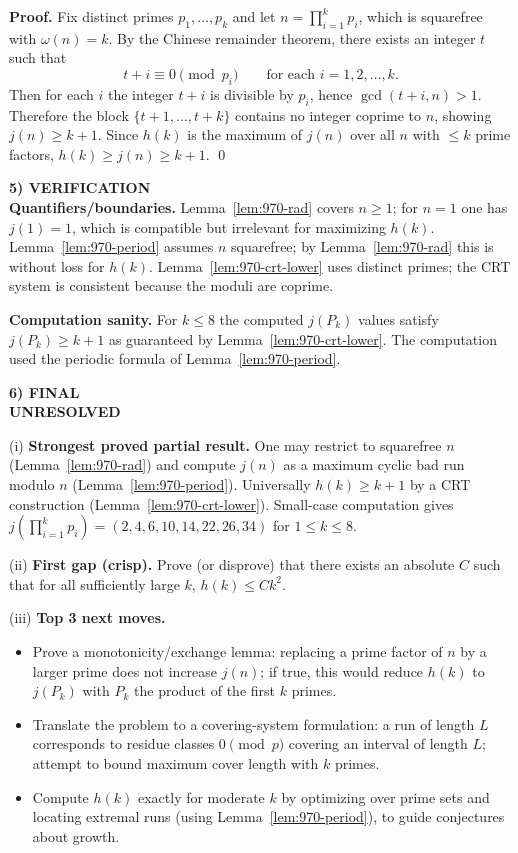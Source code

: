\noindent\textbf{Proof.}
Fix distinct primes $p_1,\dots,p_k$ and let $n=\prod_{i=1}^k p_i$, which is squarefree with $\omega(n)=k$.  By the Chinese remainder theorem, there exists an integer $t$ such that
\[
 t+i\equiv 0\pmod{p_i}\qquad\text{for each }i=1,2,\dots,k.
\]
Then for each $i$ the integer $t+i$ is divisible by $p_i$, hence $\gcd(t+i,n)>1$.
Therefore the block $\{t+1,\dots,t+k\}$ contains no integer coprime to $n$, showing $j(n)\ge k+1$.
Since $h(k)$ is the maximum of $j(n)$ over all $n$ with $\le k$ prime factors, $h(k)\ge j(n)\ge k+1$. \qed

\medskip
\noindent\textbf{5) VERIFICATION}\\
\textbf{Quantifiers/boundaries.} Lemma~\ref{lem:970-rad} covers $n\ge 1$; for $n=1$ one has $j(1)=1$, which is compatible but irrelevant for maximizing $h(k)$.
Lemma~\ref{lem:970-period} assumes $n$ squarefree; by Lemma~\ref{lem:970-rad} this is without loss for $h(k)$.
Lemma~\ref{lem:970-crt-lower} uses distinct primes; the CRT system is consistent because the moduli are coprime.

\textbf{Computation sanity.} For $k\le 8$ the computed $j(P_k)$ values satisfy $j(P_k)\ge k+1$ as guaranteed by Lemma~\ref{lem:970-crt-lower}.  The computation used the periodic formula of Lemma~\ref{lem:970-period}.

\medskip
\noindent\textbf{6) FINAL}\\
\textbf{UNRESOLVED}

(i) \textbf{Strongest proved partial result.} One may restrict to squarefree $n$ (Lemma~\ref{lem:970-rad}) and compute $j(n)$ as a maximum cyclic bad run modulo $n$ (Lemma~\ref{lem:970-period}).  Universally $h(k)\ge k+1$ by a CRT construction (Lemma~\ref{lem:970-crt-lower}).  Small-case computation gives $j(\prod_{i=1}^k p_i)=(2,4,6,10,14,22,26,34)$ for $1\le k\le 8$.

(ii) \textbf{First gap (crisp).} Prove (or disprove) that there exists an absolute $C$ such that for all sufficiently large $k$, $h(k)\le Ck^2$.

(iii) \textbf{Top 3 next moves.}
\begin{itemize}
\item Prove a monotonicity/exchange lemma: replacing a prime factor of $n$ by a larger prime does not increase $j(n)$; if true, this would reduce $h(k)$ to $j(P_k)$ with $P_k$ the product of the first $k$ primes.
\item Translate the problem to a covering-system formulation: a run of length $L$ corresponds to residue classes $0\pmod p$ covering an interval of length $L$; attempt to bound maximum cover length with $k$ primes.
\item Compute $h(k)$ exactly for moderate $k$ by optimizing over prime sets and locating extremal runs (using Lemma~\ref{lem:970-period}), to guide conjectures about growth.
\end{itemize}

